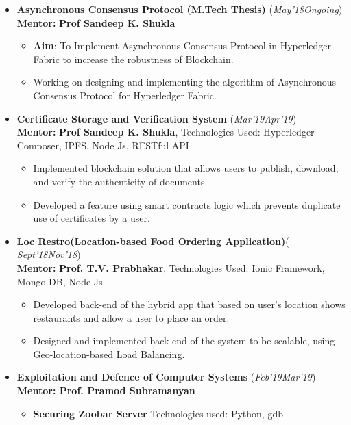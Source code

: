 \documentclass[a4paper]{article}
\begin{document}
\begin{itemize}
\item \textbf{Asynchronous Consensus Protocol (M.Tech Thesis)} \hfill\hfill(\textit{May'18\textendash     Ongoing})\\
\textbf{Mentor: }\textbf{Prof Sandeep K. Shukla } 
\begin{itemize}
\item \textbf{Aim}: To Implement Asynchronous Consensus Protocol in Hyperledger Fabric to increase the robustness of Blockchain.
\item %
Working on designing and implementing the algorithm of Asynchronous Consensus Protocol for Hyperledger Fabric.
\end{itemize}
\item \textbf{Certificate Storage and Verification System}  \hfill\hfill(\textit{Mar'19\textendash Apr'19})\\
\textbf{Mentor: }\textbf{Prof Sandeep K. Shukla}, Technologies Used: Hyperledger Composer, IPFS, Node Js, RESTful API
\begin{itemize}
\item Implemented blockchain solution that allows users to publish, download, and verify the authenticity of documents.
\item Developed a feature using smart contracts logic which prevents duplicate use of certificates by a user. 
\end{itemize}
\item \textbf{Loc Restro(Location-based Food Ordering Application)}\hfill\hfill(\textit{ Sept'18\textendash Nov'18})\\ \textbf{Mentor: }\textbf{Prof. T.V. Prabhakar}, Technologies Used: Ionic Framework, Mongo DB, Node Js
\begin{itemize}
\item Developed back-end of the hybrid app that based on user's location shows restaurants and allow a user to place an order.
\item Designed and implemented back-end of the system to be scalable, using Geo-location-based Load Balancing.
\end{itemize}
\item \textbf{Exploitation and Defence of Computer Systems} \hfill\hfill(\textit{Feb'19\textendash Mar'19})\\
\textbf{Mentor: Prof. Pramod Subramanyan}
\begin{itemize}
\item \textbf{Securing Zoobar Server} Technologies used: Python, gdb\\

\end{itemize}
\end{itemize}
\end{document}
